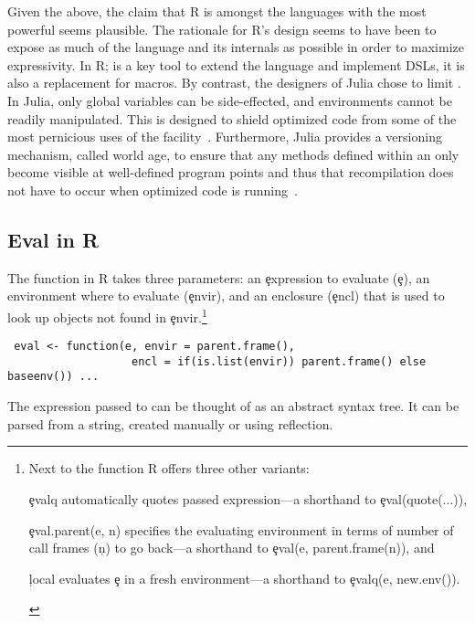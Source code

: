 \documentclass[screen,acmsmall]{acmart}%
\begin{document}
Given the above, the claim that R is amongst the languages with the most
powerful \eval seems plausible. The rationale for R's design seems to have been
to expose as much of the language and its internals as possible in order to
maximize expressivity. In R; \eval is a key tool to extend the language and
implement DSLs, it is also a replacement for macros. By contrast, the designers
of Julia chose to limit \eval. In Julia, only global variables can be
side-effected, and environments cannot be readily manipulated. This is designed
to shield optimized code from some of the most pernicious uses of the
facility~\cite{oopsla18a}. Furthermore, Julia provides a versioning mechanism,
called world age, to ensure that any methods defined within an \eval only become
visible at well-defined program points and thus that recompilation does not have
to occur when optimized code is running~\cite{oopsla20a}.

\subsection{Eval in R}\label{sec:eval-in-r}

The \eval function in R takes three parameters: an \c{expression} to evaluate
(\c{e}), an environment where to evaluate (\c{envir}), and an enclosure
(\c{encl}) that is used to look up objects not found in \c{envir}.\footnote{Next
to the \eval function R offers three other variants:
  \begin{inparaenum}[1.]
    \item \c{evalq} automatically quotes passed expression---a shorthand to
      \c{eval(quote(...))},
    \item \c{eval.parent(e, n)} specifies the evaluating environment in terms of
      number of call frames (\c{n}) to go back---a shorthand to \c{eval(e,
        parent.frame(n))}, and
    \item \c{local} evaluates \c{e} in a fresh environment---a shorthand to
      \c{evalq(e, new.env())}.
  \end{inparaenum} }

\begin{lstlisting}
 eval <- function(e, envir = parent.frame(),
                   encl = if(is.list(envir)) parent.frame() else baseenv()) ...
\end{lstlisting}

The expression passed to \eval can be thought of as an abstract syntax
tree. It can be parsed from a string, created manually or using reflection.
\end{document}
